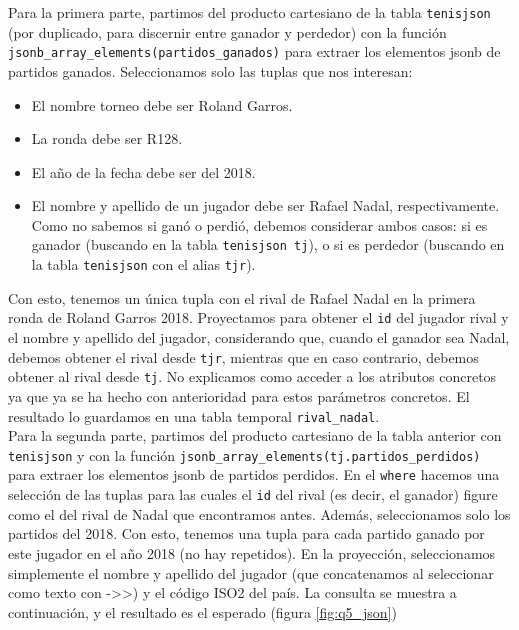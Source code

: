 Para la primera parte, partimos del producto cartesiano de la tabla \texttt{tenisjson} (por duplicado, para discernir entre ganador y perdedor) con la función \texttt{jsonb\_array\_elements(partidos\_ganados)} para extraer los elementos jsonb de partidos ganados. Seleccionamos solo las tuplas que nos interesan: 
\begin{itemize}
\item El nombre torneo debe ser Roland Garros.
\item La ronda debe ser R128.
\item El año de la fecha debe ser del 2018.
\item El nombre y apellido de un jugador debe ser Rafael Nadal, respectivamente. Como no sabemos si ganó o perdió, debemos considerar ambos casos: si es ganador (buscando en la tabla \texttt{tenisjson tj}), o si es perdedor (buscando en la tabla \texttt{tenisjson} con el alias \texttt{tjr}).
\end{itemize}

Con esto, tenemos un única tupla con el rival de Rafael Nadal en la primera ronda de Roland Garros 2018. Proyectamos para obtener el \texttt{id} del jugador rival y el nombre y apellido del jugador, considerando que, cuando el ganador sea Nadal, debemos obtener el rival desde \texttt{tjr}, mientras que en caso contrario, debemos obtener al rival desde \texttt{tj}. No explicamos como acceder a los atributos concretos ya que ya se ha hecho con anterioridad para estos parámetros concretos. El resultado lo guardamos en una tabla temporal \texttt{rival\_nadal}. \\

Para la segunda parte, partimos del producto cartesiano de la tabla anterior con \texttt{tenisjson} y con la función \texttt{jsonb\_array\_elements(tj.partidos\_perdidos)} para extraer los elementos jsonb de partidos perdidos. En el \texttt{where} hacemos una selección de las tuplas para las cuales el \texttt{id} del rival (es decir, el ganador) figure como el del rival de Nadal que encontramos antes. Además, seleccionamos solo los partidos del 2018. Con esto, tenemos una tupla para cada partido ganado por este jugador en el año 2018 (no hay repetidos). En la proyección, seleccionamos simplemente el nombre y apellido del jugador (que concatenamos al seleccionar como texto con ->>) y el código ISO2 del país. La consulta se muestra a continuación, y el resultado es el esperado (figura \ref{fig:q5_json})

